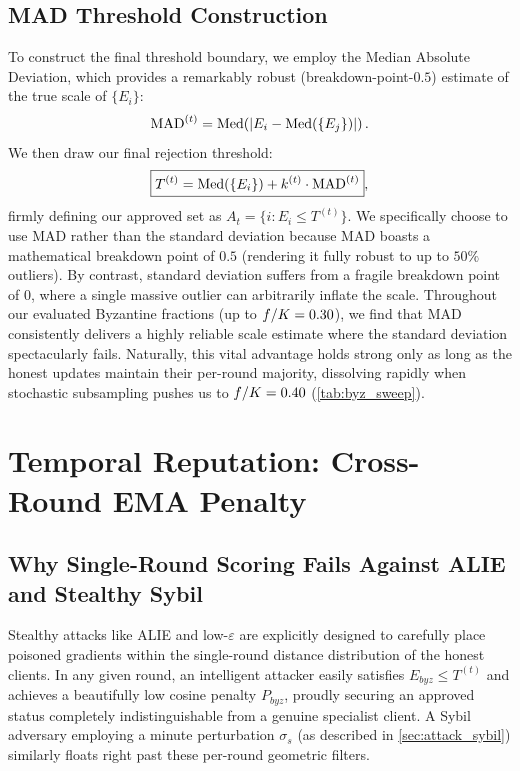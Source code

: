 \documentclass[../main.tex]{subfiles}
\begin{document}
\subsection{MAD Threshold Construction}
\label{sec:aegis_mad}

To construct the final threshold boundary, we employ the Median Absolute Deviation, which provides a remarkably robust (breakdown-point-$0.5$) estimate of the true scale of $\{E_i\}$:
\begin{equation}
    \mathrm{MAD}^{(t)} = \operatorname{Med}\!\left(\left|E_i - \operatorname{Med}\!\left(\{E_j\}\right)\right|\right).
    \label{eq:mad}
\end{equation}
We then draw our final rejection threshold:
\begin{equation}
    \boxed{T^{(t)} = \operatorname{Med}\!\left(\{E_i\}\right) + k^{(t)} \cdot \mathrm{MAD}^{(t)}},
    \label{eq:threshold}
\end{equation}
firmly defining our approved set as $A_t = \{i : E_i \leq T^{(t)}\}$. We specifically choose to use MAD rather than the standard deviation because $\mathrm{MAD}$ boasts a mathematical breakdown point of $0.5$ (rendering it fully robust to up to $50\%$ outliers). By contrast, standard deviation suffers from a fragile breakdown point of $0$, where a single massive outlier can arbitrarily inflate the scale. Throughout our evaluated Byzantine fractions (up to $f/K = 0.30$), we find that $\mathrm{MAD}$ consistently delivers a highly reliable scale estimate where the standard deviation spectacularly fails. Naturally, this vital advantage holds strong only as long as the honest updates maintain their per-round majority, dissolving rapidly when stochastic subsampling pushes us to $f/K = 0.40$ (\cref{tab:byz_sweep}).

\section{Temporal Reputation: Cross-Round EMA Penalty}
\label{sec:aegis_reputation}

\subsection{Why Single-Round Scoring Fails Against ALIE and Stealthy Sybil}
\label{sec:aegis_reputation_motivation}

Stealthy attacks like ALIE \citep{baruch2019little} and low-$\varepsilon$ \ipm{} are explicitly designed to carefully place poisoned gradients within the single-round distance distribution of the honest clients. In any given round, an intelligent attacker easily satisfies $E_{byz} \leq T^{(t)}$ and achieves a beautifully low cosine penalty $P_{byz}$, proudly securing an approved status completely indistinguishable from a genuine specialist client. A Sybil adversary employing a minute perturbation $\sigma_s$ (as described in \cref{sec:attack_sybil}) similarly floats right past these per-round geometric filters.
\end{document}
